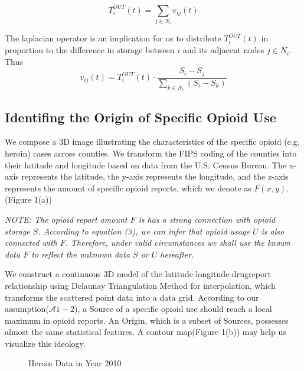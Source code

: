 \begin{equation}
T^{OUT}_i(t) = \sum_{j\in N_i}v_{ij}(t)
\end{equation}

The laplacian operator is an implication for us to distribute $T^{OUT}_i(t)$ in proportion to the difference in storage between $i$ and its adjacent nodes $j \in N_i$. Thus
\begin{equation}
v_{ij}(t) = T^{OUT}_i(t)\cdot \frac{S_i - S_j}{\sum_{k \in N_i}(S_i - S_k)}
\end{equation}



\subsection{Identifing the Origin of Specific Opioid Use}
We compose a 3D image illustrating the characteristics of the specific opioid (e.g. heroin) cases across counties. We transform the FIPS coding of the counties into their latitude and longitude based on data from the U.S. Census Bureau\cite{14}. The x-axis represents the latitude, the y-axis represents the longitude, and the z-axis represents the amount of specific opioid reports, which we denote as $F(x,y)$.(Figure 1(a))

\textit{NOTE: The opioid report amount $F$ is has a strong connection with opioid storage $S$. According to equation (3), we can infer that opioid usage $U$ is also connected with $F$. Therefore, under valid circumstances we shall use the known data $F$ to reflect the unknown data $S$ or $U$ hereafter.}

We construct a continuous 3D model of the latitude-longitude-drugreport relationship using Delaunay Triangulation Method for interpolation, which transforms the scattered point data into a data grid. According to our assumption($\mathcal{A}1-2$), a Source of a specific opioid use should reach a local maximum in opioid reports. An Origin, which is a subset of Sources, possesses almost the same statistical features. A contour map(Figure 1(b)) may help us visualize this ideology.

\begin{figure}[H]
	\centering
	\caption{Heroin Data in Year 2010}
\end{figure}

